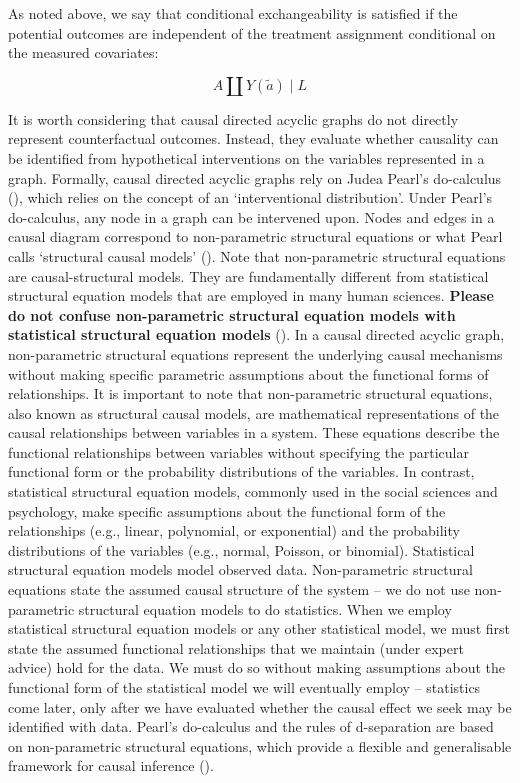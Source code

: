 \documentclass[
  single column]{article}
\begin{document}
As noted above, we say that conditional exchangeability is satisfied if
the potential outcomes are independent of the treatment assignment
conditional on the measured covariates:

\[
A \coprod Y(\tilde{a}) \mid L
\]

It is worth considering that causal directed acyclic graphs do not
directly represent counterfactual outcomes. Instead, they evaluate
whether causality can be identified from hypothetical interventions on
the variables represented in a graph. Formally, causal directed acyclic
graphs rely on Judea Pearl's do-calculus
(), which relies on the concept of
an `interventional distribution'. Under Pearl's do-calculus, any node in
a graph can be intervened upon. Nodes and edges in a causal diagram
correspond to non-parametric structural equations or what Pearl calls
`structural causal models' ().
Note that non-parametric structural equations are causal-structural
models. They are fundamentally different from statistical structural
equation models that are employed in many human sciences. \textbf{Please
do not confuse non-parametric structural equation models with
statistical structural equation models}
(). In a causal
directed acyclic graph, non-parametric structural equations represent
the underlying causal mechanisms without making specific parametric
assumptions about the functional forms of relationships. It is important
to note that non-parametric structural equations, also known as
structural causal models, are mathematical representations of the causal
relationships between variables in a system. These equations describe
the functional relationships between variables without specifying the
particular functional form or the probability distributions of the
variables. In contrast, statistical structural equation models, commonly
used in the social sciences and psychology, make specific assumptions
about the functional form of the relationships (e.g., linear,
polynomial, or exponential) and the probability distributions of the
variables (e.g., normal, Poisson, or binomial). Statistical structural
equation models model observed data. Non-parametric structural equations
state the assumed causal structure of the system -- we do not use
non-parametric structural equation models to do statistics. When we
employ statistical structural equation models or any other statistical
model, we must first state the assumed functional relationships that we
maintain (under expert advice) hold for the data. We must do so without
making assumptions about the functional form of the statistical model we
will eventually employ -- statistics come later, only after we have
evaluated whether the causal effect we seek may be identified with data.
Pearl's do-calculus and the rules of d-separation are based on
non-parametric structural equations, which provide a flexible and
generalisable framework for causal inference
().
\end{document}
